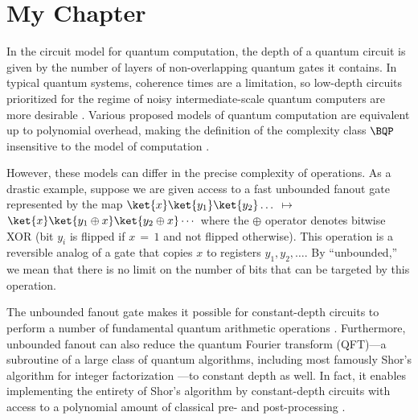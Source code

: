 \chapter{My Chapter}
In the circuit model for quantum computation, the depth of a quantum circuit is given by the number of layers of non-overlapping quantum gates it contains.
In typical quantum systems, coherence times are a limitation, so low-depth circuits prioritized for the regime of noisy intermediate-scale quantum computers are more desirable \cite{Preskill2018}.
Various proposed models of quantum computation are equivalent up to polynomial overhead, making the definition of the complexity class $\BQP$ insensitive to the model of computation \cite{Bernstein1993,Raussendorf2001,Raussendorf2003,Hoyer2005}.

However, these models can differ in the precise complexity of operations.
As a drastic example, suppose we are given access to a fast unbounded fanout gate
represented by the map
$\ket{x} \ket{y_1} \ket{y_2} \dots$\,$\mapsto$\,$\ket{x}\ket{y_1 \oplus x} \ket{y_2 \oplus x} \cdots$
where the $\oplus$ operator denotes bitwise XOR (bit $y_i$ is flipped if $x$\,$=$\,$1$ and not flipped otherwise). This operation is a reversible analog of a gate that copies $x$ to registers $y_1, y_2, \dots$.
By ``unbounded,'' we mean that there is no limit on the number of bits that can be targeted by this operation.

The unbounded fanout gate makes it possible for constant-depth circuits to perform a number of fundamental quantum arithmetic operations \cite{Hoyer2005}.
Furthermore, unbounded fanout can also reduce the quantum Fourier transform (QFT)---a subroutine of a large class of quantum algorithms, including most famously Shor’s algorithm for integer factorization \cite{Shor1997}---to constant depth as well.
In fact, it enables implementing the entirety of Shor's algorithm by constant-depth circuits with access to a polynomial amount of classical pre- and post-processing \cite{note_precomputation}.

